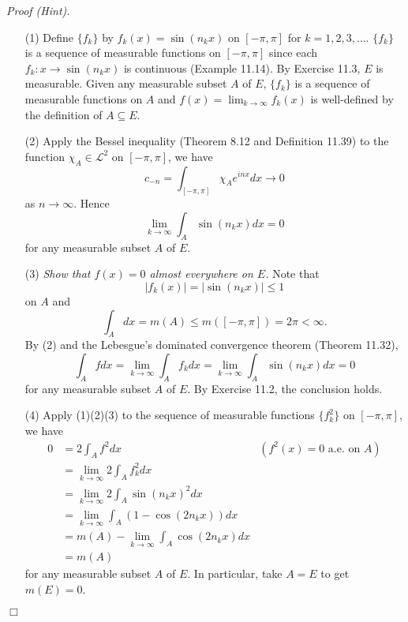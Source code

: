 \documentclass{article}
\begin{document}
\emph{Proof (Hint).}
\begin{enumerate}
\item[(1)]
  Define $\{f_k\}$ by $f_k(x) = \sin(n_k x)$ on $[-\pi,\pi]$ for $k = 1,2,3,\ldots$.
  $\{f_k\}$ is a sequence of measurable functions on $[-\pi,\pi]$
  since each $f_k: x \to \sin(n_k x)$ is continuous (Example 11.14).
  By Exercise 11.3, $E$ is measurable.
  Given any measurable subset $A$ of $E$,
  $\{f_k\}$ is a sequence of measurable functions on $A$
  and $f(x) = \lim_{k \to \infty} f_k(x)$ is well-defined by the definition of $A \subseteq E$.

\item[(2)]
  Apply the Bessel inequality (Theorem 8.12 and Definition 11.39) to
  the function $\chi_{A} \in \mathscr{L}^2$ on $[-\pi,\pi]$,
  we have
  \[
    c_{-n}
    = \int_{[-\pi,\pi]} \chi_{A} e^{inx} dx
    \to 0
  \]
  as $n \to \infty$.
  Hence
  \[
    \lim_{k \to \infty} \int_{A} \sin(n_k x) dx
    = 0
  \]
  for any measurable subset $A$ of $E$.

\item[(3)]
  \emph{Show that $f(x) = 0$ almost everywhere on $E$.}
  Note that
  \[
    |f_k(x)| = |\sin(n_k x)| \leq 1
  \]
  on $A$ and
  \[
    \int_{A} dx
    = m(A)
    \leq m([-\pi,\pi])
    = 2\pi
    < \infty.
  \]
  By (2) and the Lebesgue's dominated convergence theorem (Theorem 11.32),
  \[
    \int_{A} f dx
    = \lim_{k \to \infty} \int_{A} f_k dx
    = \lim_{k \to \infty} \int_{A} \sin(n_k x) dx
    = 0
  \]
  for any measurable subset $A$ of $E$.
  By Exercise 11.2, the conclusion holds.

\item[(4)]
  Apply (1)(2)(3) to the sequence of measurable functions $\{f_k^2\}$ on $[-\pi,\pi]$,
  we have
  \begin{align*}
    0
    &= 2 \int_{A} f^2 dx
      &(\text{$f^2(x) = 0$ a.e. on $A$}) \\
    &= \lim_{k \to \infty} 2 \int_{A} f_k^2 dx \\
    &= \lim_{k \to \infty} 2 \int_{A} \sin(n_k x)^2 dx \\
    &= \lim_{k \to \infty} \int_A (1-\cos(2n_k x)) dx \\
    &= m(A) - \lim_{k \to \infty} \int_A \cos(2n_k x) dx \\
    &= m(A)
  \end{align*}
  for any measurable subset $A$ of $E$.
  In particular, take $A = E$ to get $m(E) = 0$.
\end{enumerate}
$\Box$ \\
\end{document}
